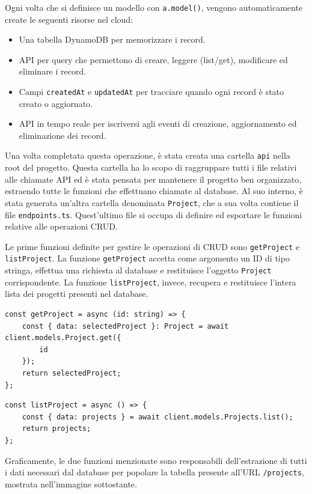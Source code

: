 \documentclass[target=bach,aauheader=,style=]{thud}
\begin{document}
\noindent Ogni volta che si definisce un modello con \texttt{a.model()}, vengono automaticamente create le seguenti risorse nel cloud:
\begin{itemize}
    \item Una tabella DynamoDB per memorizzare i record.
    \item API per query che permettono di creare, leggere (list/get), modificare ed eliminare i record.
    \item Campi \texttt{createdAt} e \texttt{updatedAt} per tracciare quando ogni record è stato creato o aggiornato.
    \item API in tempo reale per iscriversi agli eventi di creazione, aggiornamento ed eliminazione dei record.
\end{itemize}
\noindent Una volta completata questa operazione, è stata creata una cartella \texttt{api} nella root del progetto. Questa cartella ha lo scopo di raggruppare tutti i file relativi alle chiamate API ed è stata pensata per mantenere il progetto ben organizzato, estraendo tutte le funzioni che effettuano chiamate al database. Al suo interno, è stata generata un'altra cartella denominata \texttt{Project}, che a sua volta contiene il file \texttt{endpoints.ts}. Quest'ultimo file si occupa di definire ed esportare le funzioni relative alle operazioni CRUD.

\noindent Le prime funzioni definite per gestire le operazioni di CRUD sono \texttt{getProject} e \texttt{listProject}. La funzione \texttt{getProject} accetta come argomento un ID di tipo stringa, effettua una richiesta al database e restituisce l'oggetto \texttt{Project} corrispondente. La funzione \texttt{listProject}, invece, recupera e restituisce l'intera lista dei progetti presenti nel database.

\begin{lstlisting}[caption=funzione \texttt{getProject}]
const getProject = async (id: string) => {
    const { data: selectedProject }: Project = await client.models.Project.get({
        id
    });
    return selectedProject;
};
\end{lstlisting}

\begin{lstlisting}[caption=funzione \texttt{listProject}]
const listProject = async () => {
    const { data: projects } = await client.models.Projects.list();
    return projects;
};
\end{lstlisting}

\noindent Graficamente, le due funzioni menzionate sono responsabili dell'estrazione di tutti i dati necessari dal database per popolare la tabella presente all'URL \texttt{/projects}, mostrata nell'immagine sottostante.
\end{document}
